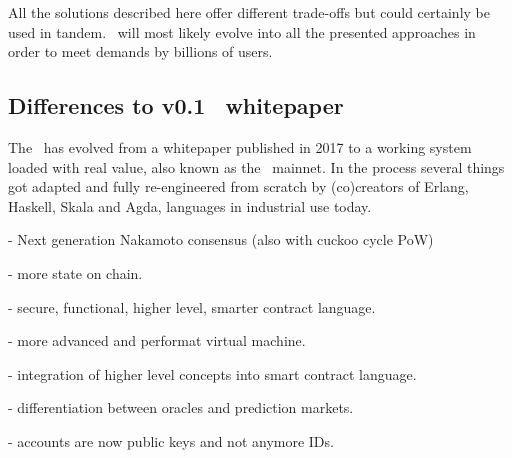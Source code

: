 All the solutions described here offer different trade-offs but could certainly
be used in tandem. \aet\ will most likely evolve into all the presented
approaches in order to meet demands by billions of users.



\subsection{Differences to v0.1 \blockchain\ whitepaper}
The \blockchain\ has evolved from a whitepaper published in 2017 to a working
system loaded with real value, also known as the \aet\ mainnet. In the process
several things got adapted and fully re-engineered from scratch by (co)creators
of Erlang, Haskell, Skala and Agda, languages in industrial use today.

- Next generation Nakamoto consensus (also with cuckoo cycle PoW)

- more state on chain.

- secure, functional, higher level, smarter contract language.

- more advanced and performat virtual machine.

- integration of higher level concepts into smart contract language.

- differentiation between oracles and prediction markets.

- accounts are now public keys and not anymore IDs.

